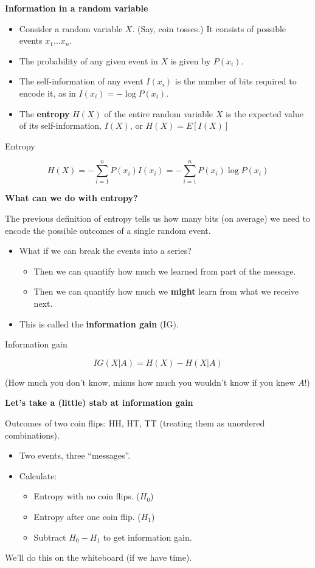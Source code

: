 \documentclass{beamer}
\newcommand{\pagestepalt}[2]{
  \begin{frame}[t]
    \begin{minipage}[t][0.26\textheight][t]{\textwidth}
      \begin{center}
        \huge
        \textbf{#1}
      \end{center}
    \end{minipage}
    
    \begin{minipage}[t][0.7\textheight][c]{\textwidth}
      #2
    \end{minipage}
  \end{frame}
}
\begin{document}
\pagestepalt{Information in a random variable}{
  \begin{itemize}
  \item Consider a random variable $X$. (Say, coin tosses.) It consists of possible events $x_1 \ldots x_n$.\pause
  \item The probability of any given event in $X$ is given by $P(x_i)$.\pause
  \item The self-information of any event $I(x_i)$ is the number of bits required to encode it, as in $I(x_i)=-\log P(x_i)$. \pause
  \item The \textbf{entropy} $H(X)$ of the entire random variable $X$ is the expected value of its self-information, $I(X)$, or $H(X)=E[I(X)]$\pause
  \end{itemize}
  \begin{block}{Entropy}
    \begin{center}
      $$H(X) = -\sum_{i=1}^{n} P(x_i)I(x_i) = -\sum_{i=1}^{n} P(x_i) \log P(x_i)$$
    \end{center}
  \end{block}
}

\pagestepalt{What can we do with entropy?}{
  The previous definition of entropy tells us how many bits (on average)
  we need to encode the possible outcomes of a \alert{single random event}.\pause
  \begin{itemize}
  \item What if we can break the events into a series?\pause
    \begin{itemize}
    \item Then we can quantify \alert{how much we learned from part of the message}.\pause
    \item Then we can quantify how much we \textbf{might} learn from what we receive next.\pause
    \end{itemize}
  \item This is called the \textbf{information gain} (IG).
  \end{itemize}
  \begin{block}{Information gain}
    \begin{center}
      $$IG(X \vert A) = H(X) - H(X \vert A)$$
    \end{center}
  \end{block}\pause
  (How much you don't know, minus how much you wouldn't know if you knew $A$!)
}

\pagestepalt{Let's take a (little) stab at information gain}{
  Outcomes of two coin flips: HH, HT, TT (treating them as unordered combinations).\pause
  \begin{itemize}
  \item Two events, three ``messages''.\pause
  \item Calculate:
    \begin{itemize}
    \item Entropy with no coin flips. ($H_0$)
    \item Entropy after one coin flip. ($H_1$)
    \item Subtract $H_0 - H_1$ to get information gain.
    \end{itemize}
  \end{itemize}\pause
  We'll do this on the whiteboard (if we have time).
}
\end{document}
